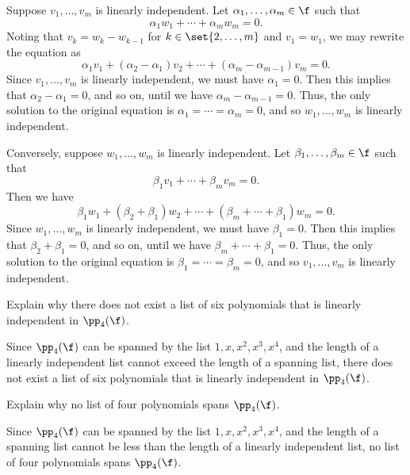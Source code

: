 \begin{sol}
    Suppose $v_1, \ldots, v_m$ is linearly independent. Let $\alpha_1, \ldots, \alpha_m \in \f$ such that
    \[\alpha_1 w_1 + \cdots + \alpha_m w_m = 0.\]
    Noting that $v_k = w_k - w_{k-1}$ for $k \in \set{2, \ldots, m}$ and $v_1 = w_1$, we may rewrite the equation as
    \[\alpha_1 v_1 + (\alpha_2 - \alpha_1)v_2 + \cdots + (\alpha_m - \alpha_{m-1})v_m = 0.\]
    Since $v_1, \ldots, v_m$ is linearly independent, we must have $\alpha_1 = 0$. Then this implies that $\alpha_2 - \alpha_1 = 0$, and so on, until we have $\alpha_m - \alpha_{m-1} = 0$. Thus, the only solution to the original equation is $\alpha_1 = \cdots = \alpha_m = 0$, and so $w_1, \ldots, w_m$ is linearly independent.

    Conversely, suppose $w_1, \ldots, w_m$ is linearly independent. Let $\beta_1, \ldots, \beta_m \in \f$ such that
    \[\beta_1 v_1 + \cdots + \beta_m v_m = 0.\]
    Then we have
    \[\beta_1 w_1 + (\beta_2 + \beta_1) w_2 + \cdots + (\beta_m + \cdots + \beta_1) w_m = 0.\]
    Since $w_1, \ldots, w_m$ is linearly independent, we must have $\beta_1 = 0$. Then this implies that $\beta_2 + \beta_1 = 0$, and so on, until we have $\beta_m + \cdots + \beta_1 = 0$. Thus, the only solution to the original equation is $\beta_1 = \cdots = \beta_m = 0$, and so $v_1, \ldots, v_m$ is linearly independent.
\end{sol}
 
\begin{exercise}[2a15]
    Explain why there does not exist a list of six polynomials that is linearly independent in $\pp_4(\f)$.
\end{exercise}

\begin{sol}
    Since $\pp_4(\f)$ can be spanned by the list $1, x, x^2, x^3, x^4$, and the length of a linearly independent list cannot exceed the length of a spanning list, there does not exist a list of six polynomials that is linearly independent in $\pp_4(\f)$.
\end{sol}
 
\begin{exercise}[2a16]
    Explain why no list of four polynomials spans $\pp_4(\f)$.
\end{exercise}

\begin{sol}
    Since $\pp_4(\f)$ can be spanned by the list $1, x, x^2, x^3, x^4$, and the length of a spanning list cannot be less than the length of a linearly independent list, no list of four polynomials spans $\pp_4(\f)$.
\end{sol}
 
